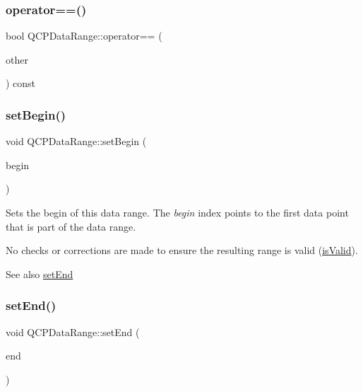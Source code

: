 \mbox{\label{class_q_c_p_data_range_a8bfd79a282f6ebd766d60caa683242d3}} 
\subsubsection{\texorpdfstring{operator==()}{operator==()}}
{\footnotesize\ttfamily bool Q\+C\+P\+Data\+Range\+::operator== (\begin{DoxyParamCaption}\item[{const \mbox{\hyperlink{class_q_c_p_data_range}{Q\+C\+P\+Data\+Range}} \&}]{other }\end{DoxyParamCaption}) const\hspace{0.3cm}{\ttfamily [inline]}}

\mbox{\label{class_q_c_p_data_range_a54ff59048e01e46ac4aefafc844626c6}} 
\subsubsection{\texorpdfstring{setBegin()}{setBegin()}}
{\footnotesize\ttfamily void Q\+C\+P\+Data\+Range\+::set\+Begin (\begin{DoxyParamCaption}\item[{int}]{begin }\end{DoxyParamCaption})\hspace{0.3cm}{\ttfamily [inline]}}

Sets the begin of this data range. The {\itshape begin} index points to the first data point that is part of the data range.

No checks or corrections are made to ensure the resulting range is valid (\mbox{\hyperlink{class_q_c_p_data_range_aae53a37472212dca0a7939963e20dba0}{is\+Valid}}).

\begin{DoxySeeAlso}{See also}
\mbox{\hyperlink{class_q_c_p_data_range_a277f1a9eafe70b9184d9c00b641ae5de}{set\+End}} 
\end{DoxySeeAlso}
\mbox{\label{class_q_c_p_data_range_a277f1a9eafe70b9184d9c00b641ae5de}} 
\subsubsection{\texorpdfstring{setEnd()}{setEnd()}}
{\footnotesize\ttfamily void Q\+C\+P\+Data\+Range\+::set\+End (\begin{DoxyParamCaption}\item[{int}]{end }\end{DoxyParamCaption})\hspace{0.3cm}{\ttfamily [inline]}}

